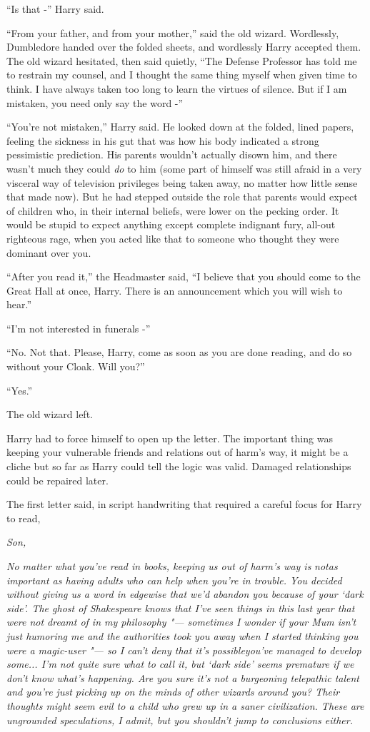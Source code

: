 ``Is that -'' Harry said.

``From your father, and from your mother,'' said the old wizard.
Wordlessly, Dumbledore handed over the folded sheets, and wordlessly
Harry accepted them. The old wizard hesitated, then said quietly, ``The
Defense Professor has told me to restrain my counsel, and I thought the
same thing myself when given time to think. I have always taken too long
to learn the virtues of silence. But if I am mistaken, you need only say
the word -''

``You're not mistaken,'' Harry said. He looked down at the folded, lined
papers, feeling the sickness in his gut that was how his body indicated
a strong pessimistic prediction. His parents wouldn't actually disown
him, and there wasn't much they could \emph{do} to him (some part of
himself was still afraid in a very visceral way of television privileges
being taken away, no matter how little sense that made now). But he had
stepped outside the role that parents would expect of children who, in
their internal beliefs, were lower on the pecking order. It would be
stupid to expect anything except complete indignant fury, all-out
righteous rage, when you acted like that to someone who thought they
were dominant over you.

``After you read it,'' the Headmaster said, ``I believe that you should
come to the Great Hall at once, Harry. There is an announcement which
you will wish to hear.''

``I'm not interested in funerals -''

``No. Not that. Please, Harry, come as soon as you are done reading, and
do so without your Cloak. Will you?''

``Yes.''

The old wizard left.

Harry had to force himself to open up the letter. The important thing
was keeping your vulnerable friends and relations out of harm's way, it
might be a cliche but so far as Harry could tell the logic was valid.
Damaged relationships could be repaired later.

The first letter said, in script handwriting that required a careful
focus for Harry to read,

\emph{Son,}

\emph{No matter what you've read in books, keeping us out of harm's way
is} \emph{not}\emph{as important as having adults who can help when
you're in trouble. You decided without giving us a word in edgewise that
we'd abandon you because of your `dark side'. The ghost of Shakespeare
knows that I've seen things in this last year that were not dreamt of in
my philosophy "--- sometimes I wonder if your Mum isn't just humoring me
and the authorities took you away when I started thinking you were a
magic-user "--- so I can't deny that it's} \emph{possible}\emph{you've
managed to develop some... I'm not quite sure what to call it, but
`dark side' seems premature if we don't know what's happening. Are you
sure it's not a burgeoning telepathic talent and you're just picking up
on the minds of other wizards around you? Their thoughts might seem evil
to a child who grew up in a saner civilization. These are ungrounded
speculations, I admit, but you shouldn't jump to conclusions either.}

